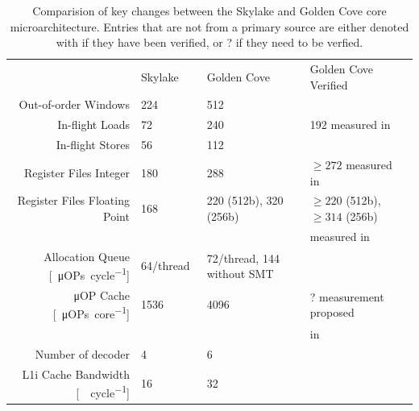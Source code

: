 \begin{table}
	\centering
	\caption{\label{tab:micro-arch-params}Comparision of key changes between the Skylake and Golden Cove core microarchitecture. Entries that are not from a primary source are either denoted with \checkmark if they have been verified, or ? if they need to be verfied.}
	\begin{tabular}{r|lll}
		\toprule
			&	Skylake & Golden Cove & Golden Cove Verified \\
		\rowcolor[HTML]{EFEFEF}Out-of-order Windows		& 224~\cite{Intel_2017_Skylake_SP} & 512~\cite{Intel_2021_Architecture_Day,ServerTheHome_2023_SPR_Press,Wccftech_2023_SPR_Press} & \checkmark~\figref{robsize-reorder} \\
		In-flight Loads & 72~\cite{Intel_2017_Skylake_SP} & 240~\cite{ServerTheHome_2023_SPR_Press,Wccftech_2023_SPR_Press} & 192 measured in~\figref{robsize-load} \\
		\rowcolor[HTML]{EFEFEF}In-flight Stores & 56~\cite{Intel_2017_Skylake_SP} & 112~\cite{ServerTheHome_2023_SPR_Press,Wccftech_2023_SPR_Press} & \checkmark~\figref{robsize-store} \\
		Register Files Integer & 180~\cite{Intel_2017_Skylake_SP} & 288~\cite{ServerTheHome_2023_SPR_Press,Wccftech_2023_SPR_Press} & $\geq 272$ measured in~\figref{robsize-registers} \\
		\rowcolor[HTML]{EFEFEF}Register Files Floating Point & 168~\cite{Intel_2017_Skylake_SP} & 220 (512b), 320 (256b)~\cite{ServerTheHome_2023_SPR_Press,Wccftech_2023_SPR_Press} & $\geq 220$ (512b), $\geq 314$ (256b) \\
		\rowcolor[HTML]{EFEFEF} & & & measured in~\figref{robsize-registers} \\
		Allocation Queue [\SI{}{\micro OPs\per cycle}]& 64/thread~\cite{Intel_2017_Skylake_SP} & 72/thread, 144 without SMT~\cite{Intel_2021_Architecture_Day,ServerTheHome_2023_SPR_Press,Wccftech_2023_SPR_Press,Intel_Optimization_Reference_Manual_050} & \\
		\rowcolor[HTML]{EFEFEF}μOP Cache [\SI{}{\micro OPs\per core}] & \SI{1536}{}~\cite{Wikichip_SkylakeSP} & \SI{4096}{}~\cite{Intel_2021_Architecture_Day} & ? measurement proposed \\
		\rowcolor[HTML]{EFEFEF} & & & in~\cite{Schoene_2021_FIRESTARTER2} \\
		Number of decoder & \SI{4}{}~\cite{Wikichip_SkylakeSP} & \SI{6}{}~\cite{Intel_2021_Architecture_Day,Intel_Optimization_Reference_Manual_050} & \\
		\rowcolor[HTML]{EFEFEF}L1i Cache Bandwidth [\SI{}{\byte\per cycle}] & \SI{16}{}~\cite{Wikichip_SkylakeSP} & \SI{32}{}~\cite{Intel_Optimization_Reference_Manual_050} & \\

\end{tabular}
\end{table}
